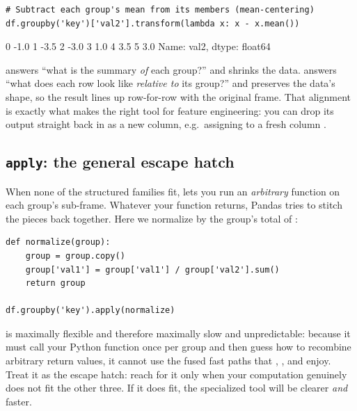 \documentclass[11pt]{article}
\begin{document}
\begin{lstlisting}
# Subtract each group's mean from its members (mean-centering)
df.groupby('key')['val2'].transform(lambda x: x - x.mean())
\end{lstlisting}

\begin{outblock}
0   -1.0
1   -3.5
2   -3.0
3    1.0
4    3.5
5    3.0
Name: val2, dtype: float64
\end{outblock}

\begin{keyidea}
 answers ``what is the summary \emph{of} each group?'' and shrinks the data.  answers ``what does each row look like \emph{relative to} its group?'' and preserves the data's shape, so the result lines up row-for-row with the original frame. That alignment is exactly what makes  the right tool for feature engineering: you can drop its output straight back in as a new column, e.g.\ assigning  to a fresh column .
\end{keyidea}

\subsection{\texttt{apply}: the general escape hatch}

When none of the structured families fit,  lets you run an \emph{arbitrary} function on each group's sub-frame. Whatever your function returns, Pandas tries to stitch the pieces back together. Here we normalize  by the group's total of :

\begin{lstlisting}
def normalize(group):
    group = group.copy()
    group['val1'] = group['val1'] / group['val2'].sum()
    return group

df.groupby('key').apply(normalize)
\end{lstlisting}

\begin{intuition}
 is maximally flexible and therefore maximally slow and unpredictable: because it must call your Python function once per group and then guess how to recombine arbitrary return values, it cannot use the fused fast paths that , , and  enjoy. Treat it as the escape hatch: reach for it only when your computation genuinely does not fit the other three. If it does fit, the specialized tool will be clearer \emph{and} faster.
\end{intuition}
\end{document}
